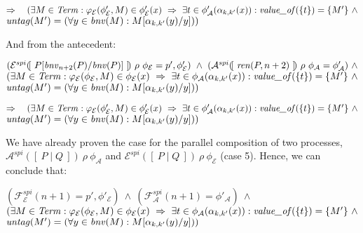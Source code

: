 \documentclass[10pt,a4paper,final,oneside,fleqn]{book}
\begin{document}
\noindent
$\Rightarrow~~~(\exists M\in\mbox{{\itshape Term\/}}:\varphi_\mathcal{E}(\phi'_\mathcal{E},M)\in\phi'_\mathcal{E}(x)~\Rightarrow~\exists t\in\phi'_\mathcal{A}(\alpha_{k,k'}(x)): \mbox{{\itshape value\_of\/}}(\{t\})=\{M'\}~\wedge$\\
$\mbox{{\itshape untag\/}}(M')=(\forall y\in\mbox{{\itshape bnv\/}}(M):M[\alpha_{k,k'}(y)/y]))$\vspace{5mm}

\noindent
And from the antecedent:

\noindent
$(\mathcal{E}^{spi}(\![~P[\mbox{{\itshape bnv\/}}_{n+2}(P)/\mbox{{\itshape bnv\/}}(P)]~]\!)~\rho~\phi_\mathcal{E}=p',\phi'_\mathcal{E})~\wedge~(\mathcal{A}^{spi}(\![~\mbox{{\itshape ren\/}}(P,{n+2})~]\!)~\rho~\phi_\mathcal{A}=\phi'_\mathcal{A})~\wedge$\\
$(\exists M\in\mbox{{\itshape Term\/}}:\varphi_\mathcal{E}(\phi_\mathcal{E},M)\in\phi_\mathcal{E}(x)~\Rightarrow~\exists t\in\phi_\mathcal{A}(\alpha_{k,k'}(x)):\mbox{{\itshape value\_of\/}}(\{t\})=\{M'\}~\wedge$\\
$\mbox{{\itshape untag\/}}(M')=(\forall y\in\mbox{{\itshape bnv\/}}(M):M[\alpha_{k,k'}(y)/y]))$\vspace{5mm}

\noindent
$\Rightarrow~~~(\exists M\in\mbox{{\itshape Term\/}}:\varphi_\mathcal{E}(\phi'_\mathcal{E},M)\in\phi'_\mathcal{E}(x)~\Rightarrow~\exists t\in\phi'_\mathcal{A}(\alpha_{k,k'}(x)): \mbox{{\itshape value\_of\/}}(\{t\})=\{M'\}~\wedge$\\
$\mbox{{\itshape untag\/}}(M')=(\forall y\in\mbox{{\itshape bnv\/}}(M):M[\alpha_{k,k'}(y)/y]))$\vspace{5mm}

\noindent
We have already proven the case for the parallel composition of two processes,\\$\mathcal{A}^{spi}(\![~P\mid Q~]\!)~\rho~\phi_\mathcal{A}$ and $\mathcal{E}^{spi}(\![~P\mid Q~]\!)~\rho~\phi_\mathcal{E}$ (case 5).  Hence, we can conclude that:

\noindent
$(\mathcal{F}_\mathcal{E}^{spi}(n+1)=p',\phi'_\mathcal{E})~\wedge~(\mathcal{F}_\mathcal{A}^{spi}(n+1)=\phi'_\mathcal{A})~\wedge$\\
$(\exists M\in\mbox{{\itshape Term\/}}:\varphi_\mathcal{E}(\phi_\mathcal{E},M)\in\phi_\mathcal{E}(x)~\Rightarrow~\exists t\in\phi_\mathcal{A}(\alpha_{k,k'}(x)):\mbox{{\itshape value\_of\/}}(\{t\})=\{M'\}~\wedge$\\
$\mbox{{\itshape untag\/}}(M')=(\forall y\in\mbox{{\itshape bnv\/}}(M):M[\alpha_{k,k'}(y)/y]))$\vspace{5mm}
\end{document}
